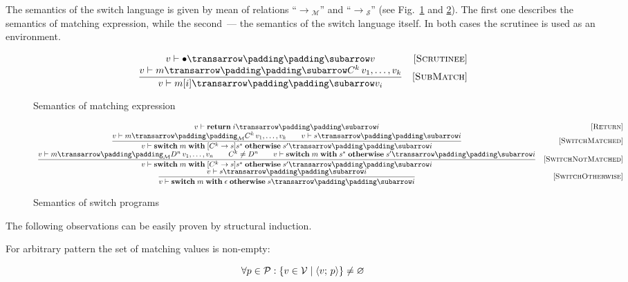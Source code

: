 The semantics of the switch language is given by mean of relations ``$\xrightarrow{}{}_{\mathcal M}$'' and ``$\xrightarrow{}{}_{\mathcal S}$''
(see Fig.~\ref{fig:matchexpr} and \ref{fig:test-and-branch}). The first one describes the semantics of matching expression, while
the second~--- the semantics of the switch language itself. In both cases the scrutinee is used as an environment.


\begin{figure}
  \renewcommand*{\arraystretch}{2}
  \setarrow{\xrightarrow}
  \[
  \begin{array}{cr}
    \withenv{v}{\trans{\bullet}{}{v}} & \ruleno{Scrutinee} \\
    \trule{\withenv{v}{\trans{m}{}{C^k\,v_1,\dots,v_k}}}{\withenv{v}{\trans{m[i]}{}{v_i}}} & \ruleno{SubMatch} 
  \end{array}
  \]
  \caption{Semantics of matching expression}
  \label{fig:matchexpr}
\end{figure}

\begin{figure}
  \renewcommand*{\arraystretch}{3}
  \setarrow{\xrightarrow}
  \[
  \begin{array}{cr}
    \withenv{v}{\trans{\primi{return}\;i}{}{i}} & \ruleno{Return}\\
    \trule{{\setsubarrow{_{\mathcal M}}\withenv{v}{\trans{m}{}{C^k\,v_1,\dots,v_k}}}\qquad \withenv{v}{\trans{s}{}{i}}}
          {\withenv{v}{\trans{\primi{switch}\;m\;\primi{with}\;[C^k\to s]s^*\;\primi{otherwise}\;s^\prime}{}{i}}} & \ruleno{SwitchMatched}\\
    \trule{{\setsubarrow{_{\mathcal M}}\withenv{v}{\trans{m}{}{D^n\,v_1,\dots,v_n}}}\qquad C^k\ne D^n\qquad \withenv{v}{\trans{\primi{switch}\;m\;\primi{with}\;s^*\;\primi{otherwise}\;s^\prime}{}{i}}}
          {\withenv{v}{\trans{\primi{switch}\;m\;\primi{with}\;[C^k\to s]s^*\;\primi{otherwise}\;s^\prime}{}{i}}} & \ruleno{SwitchNotMatched}\\
    \trule{\withenv{v}{\trans{s}{}{i}}}{\withenv{v}{\trans{\primi{switch}\;m\;\primi{with}\;\epsilon\;\primi{otherwise}\;s}{}{i}}} & \ruleno{SwitchOtherwise}
  \end{array}
  \]
  \caption{Semantics of switch programs}
  \label{fig:test-and-branch}
\end{figure}

The following observations can be easily proven by structural induction.

\begin{Observation}
  For arbitrary pattern the set of matching values is non-empty:

  \[
  \forall p\in\mathcal P : \{v\in\mathcal V\mid \left<{v;\,p}\right>\}\ne\varnothing
  \]
\end{Observation}

